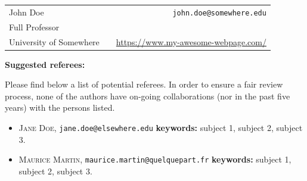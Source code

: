 \documentclass{article}
\begin{document}
\newpage


\begin{center}
  \begin{tabular}{lcr}
    John Doe & & \texttt{john.doe@somewhere.edu} \\
    Full Professor & &\\
    University of Somewhere  & & \url{https://www.my-awesome-webpage.com/}\\
  \end{tabular}
\end{center}

\vspace{2em}


\textbf{Suggested referees:}

Please find below a list of potential referees.
In order to ensure a fair review process, none of the authors have on-going collaborations (nor in the past five years) with the persons listed.

\begin{itemize}
\item \textsc{Jane Doe},
  \texttt{jane.doe@elsewhere.edu}
  \newline \textbf{keywords:} subject 1, subject 2, subject 3.

\item \textsc{Maurice Martin},
  \texttt{maurice.martin@quelquepart.fr}
  \newline \textbf{keywords:} subject 1, subject 2, subject 3.
\end{itemize}
\end{document}
